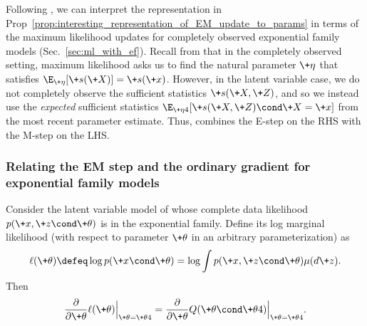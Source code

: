 \documentclass{article} %
\newcommand{\obs}{\+x}
\newcommand{\obsCaps}{X}
\newcommand{\sufficientStatsFunction}{\+s}
\newcommand{\param}{\+\theta}
\newcommand{\naturalParam}{\+\eta}
\begin{document}
\begin{remark} Following \citet[pp.4]{dempster1977maximum}, we can interpret the representation in Prop~\ref{prop:interesting_representation_of_EM_update_to_params} in terms of the maximum likelihood updates for completely observed exponential family models (Sec.~\ref{sec:ml_with_ef}). Recall from  that in the completely observed setting, maximum likelihood asks us to find the natural parameter $\naturalParam$ that satisfies $\E_{\naturalParam}[\sufficientStatsFunction(\+\obsCaps)] = \sufficientStatsFunction(\obs)$.  However, in the latent variable case, we do not completely observe the sufficient statistics $\sufficientStatsFunction(\+X,\+Z)$, and so we instead use the \textit{expected} sufficient statistics $\E_{\naturalParam^^t}[\sufficientStatsFunction(\+X,\+Z) \cond \+X=\+x]$ from the most recent parameter estimate. Thus,   combines the E-step on the RHS with the M-step on the LHS.
\label{rk:interpreting_the_EM_step_for_exponential_family_models}
\end{remark}




\subsubsection{Relating the EM step and the ordinary gradient for exponential family models}


\begin{proposition}
Consider the latent variable model of   whose complete data likelihood  $p(\+x, \+z \cond \param)$ is in the exponential family.  Define its log marginal likelihood (with respect to parameter $\param$ in an arbitrary parameterization) as
% 
\begin{align}
\ell(\param) \defeq \log p(\+x \cond \param) = \log \int p(\+x,\+z \cond \param) \mu(d\+z).	
\label{eqn:log_marginal_likelihood_definition}
\end{align}
%
Then 
%
\begin{align}
\frac{\partial }{\partial \param} \ell(\param) \Bigr|_{\param = \param^^t} = \frac{\partial }{\partial \param} Q(\param \cond \param^^t) \Bigr|_{\param = \param^^t}.
\end{align}
%
\label{prop:Q_function_and_log_marginal_likelihood_have_the_same_gradients_when_evaluated_at_the_current_param_value}
\end{proposition}
\end{document}

